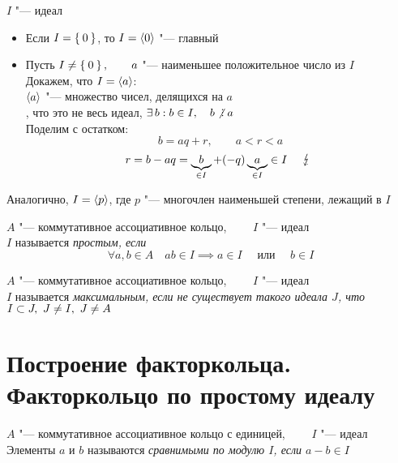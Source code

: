 \begin{eproof}
	\item $ I $ "--- идеал
	\begin{itemize}
		\item Если $ I = \Set{0} $, то $ I = \Braket{0} $ "--- главный
		\item Пусть $ I \ne \Set{0}, \qquad a $ "--- наименьшее положительное число из $ I $ \\
		Докажем, что $ I = \Braket{a} $: \\
		$ \Braket{a} $ "--- множество чисел, делящихся на $ a $ \\
		, что это не весь идеал, \ie $ \exist b : b \in I, \quad b \ndivby a $ \\
		Поделим с остатком:
		$$ b = aq + r, \qquad a < r < a $$
		$$ r = b - aq = \underbrace{b}_{\in I} + (-q)\underbrace{a}_{\in I} \in I \quad \contra $$
	\end{itemize}

	\item Аналогично, $ I = \Braket{p} $, где $ p $ "--- многочлен наименьшей степени, лежащий в $ I $
\end{eproof}

\begin{definition}
	$ A $ "--- коммутативное ассоциативное кольцо, $ \qquad I $ "--- идеал \\
	$ I $ называется \it{простым}, если
	$$ \forall a, b \in A \quad ab \in I \implies a \in I \quad \text{ или } \quad b \in I $$
\end{definition}

\begin{definition}
	$ A $ "--- коммутативное ассоциативное кольцо, $ \qquad I $ "--- идеал \\
	$ I $ называется \it{максимальным}, если не существует такого идеала $ J $, что $ I \subset J, ~ J \ne I, ~ J \ne A $
\end{definition}

\section{Построение факторкольца. Факторкольцо по простому идеалу}

\begin{definition}
	$ A $ "--- коммутативное ассоциативное кольцо с единицей, $ \qquad I $ "--- идеал \\
	Элементы $ a $ и $ b $ называются \it{сравнимыми по модулю} $ I $, если $ a - b \in I $
\end{definition}

